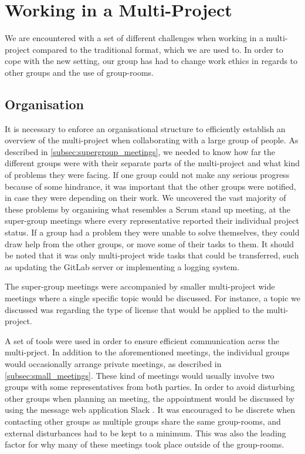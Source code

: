 \section{Working in a Multi-Project}
We are encountered with a set of different challenges when working in a multi-project compared to the traditional format, which we are used to. In order to cope with the new setting, our group has had to change work ethics in regards to other groups and the use of group-rooms.

\subsection*{Organisation}
It is necessary to enforce an organisational structure to efficiently establish an overview of the multi-project when collaborating with a large group of people. As described in \cref{subsec:supergroup_meetings}, we needed to know how far the different groups were with their separate parts of the multi-project and what kind of problems they were facing. If one group could not make any serious progress because of some hindrance, it was important that the other groups were notified, in case they were depending on their work. We uncovered the vast majority of these problems by organising what resembles a Scrum stand up meeting, at the super-group meetings where every representative reported their individual project status. If a group had a problem they were unable to solve themselves, they could draw help from the other groups, or move some of their tasks to them. It should be noted that it was only multi-project wide tasks that could be transferred, such as updating the GitLab server or implementing a logging system.

The super-group meetings were accompanied by smaller multi-project wide meetings where a single specific topic would be discussed. For instance, a topic we discussed was regarding the type of license that would be applied to the multi-project.

A set of tools were used in order to ensure efficient communication acrss the multi-prject. In addition to the aforementioned meetings, the individual groups would occasionally arrange private meetings, as described in \cref{subsec:small_meetings}. These kind of meetings would usually involve two groups with some representatives from both parties. In order to avoid disturbing other groups when planning an meeting, the appointment would be discussed by using the message web application Slack \cite{slack}. It was encouraged to be discrete when contacting other groups as multiple groups share the same group-rooms, and external disturbances had to be kept to a minimum. This was also the leading factor for why many of these meetings took place outside of the group-rooms.

